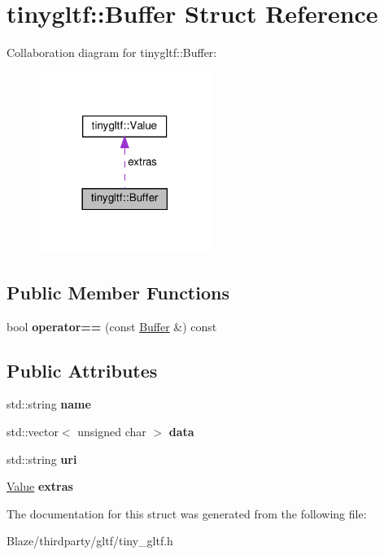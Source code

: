 \hypertarget{structtinygltf_1_1Buffer}{}\section{tinygltf\+:\+:Buffer Struct Reference}
\label{structtinygltf_1_1Buffer}


Collaboration diagram for tinygltf\+:\+:Buffer\+:\nopagebreak
\begin{figure}[H]
\begin{center}
\leavevmode
\includegraphics[width=158pt]{structtinygltf_1_1Buffer__coll__graph}
\end{center}
\end{figure}
\subsection*{Public Member Functions}
\begin{DoxyCompactItemize}
\item 
\mbox{\label{structtinygltf_1_1Buffer_ae2cccb962b4b6f78c61ef99aa7e29a99}} 
bool {\bfseries operator==} (const \hyperlink{structtinygltf_1_1Buffer}{Buffer} \&) const
\end{DoxyCompactItemize}
\subsection*{Public Attributes}
\begin{DoxyCompactItemize}
\item 
\mbox{\label{structtinygltf_1_1Buffer_a1051dd31dcdba09b90dfd5da8e0ed1db}} 
std\+::string {\bfseries name}
\item 
\mbox{\label{structtinygltf_1_1Buffer_a5545746990373cc05baaa09812a5f269}} 
std\+::vector$<$ unsigned char $>$ {\bfseries data}
\item 
\mbox{\label{structtinygltf_1_1Buffer_a10453f60300009c64e62560fbd3ff76d}} 
std\+::string {\bfseries uri}
\item 
\mbox{\label{structtinygltf_1_1Buffer_aafd1ec5111a19b266620f75ad5d6a25a}} 
\hyperlink{classtinygltf_1_1Value}{Value} {\bfseries extras}
\end{DoxyCompactItemize}


The documentation for this struct was generated from the following file\+:\begin{DoxyCompactItemize}
\item 
Blaze/thirdparty/gltf/tiny\+\_\+gltf.\+h\end{DoxyCompactItemize}
